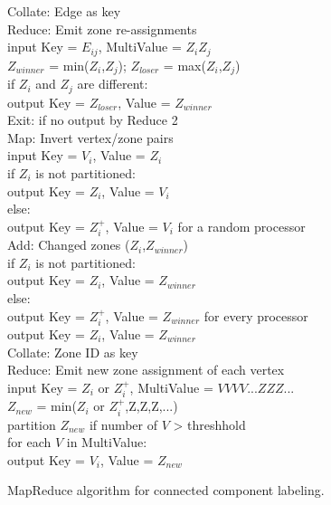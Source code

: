 \begin{figure}[htb]
\begin{center}
{\begin{minipage}{\textwidth}
\begin{tabbing}
 Collate: \> Edge as key \\
 Reduce: \> Emit zone re-assignments \\
       \> \> \> input Key = $E_{ij}$, MultiValue = $Z_i Z_j$ \\
       \> \> \> $Z_{winner}$ = min($Z_i$,$Z_j$); $Z_{loser}$ = max($Z_i$,$Z_j$) \\
       \> \> \> if $Z_i$ and $Z_j$ are different: \\
      \> \> \> \> output Key = $Z_{loser}$, Value = $Z_{winner}$ \\
 Exit: \> if no output by Reduce 2 \\
 Map: \> Invert vertex/zone pairs \\
    \> \> \> input Key = $V_i$, Value = $Z_i$ \\
    \> \> \> if $Z_i$ is not partitioned: \\
   \> \> \> \> output Key = $Z_i$, Value = $V_i$ \\
    \> \> \> else: \\
   \> \> \> \> output Key = $Z_i^+$, Value = $V_i$ for a random processor \\
 Add: \> Changed zones ($Z_i$,$Z_{winner}$) \\
    \> \> \> if $Z_i$ is not partitioned: \\
   \> \> \> \> output Key = $Z_i$, Value = $Z_{winner}$ \\
    \> \> \> else: \\
   \> \> \> \> output Key = $Z_i^+$, Value = $Z_{winner}$ for every processor \\
   \> \> \> \> output Key = $Z_i$, Value = $Z_{winner}$ \\
 Collate: \> Zone ID as key \\
 Reduce: \> Emit new zone assignment of each vertex \\
       \> \> \> input Key = $Z_i$ or $Z_i^+$, MultiValue = $V V V V ... Z Z Z ...$ \\
       \> \> \> $Z_{new}$ = min($Z_i$ or $Z_i^+$,Z,Z,Z,...) \\
       \> \> \> partition $Z_{new}$ if number of $V$ > threshhold \\
       \> \> \> for each $V$ in MultiValue: \\
      \> \> \> \> output Key = $V_i$, Value = $Z_{new}$

  \end{tabbing}
 \end{minipage}}\end{center}

 \caption{MapReduce algorithm for connected component labeling.}

 \label{fig:cc}
\end{figure}

